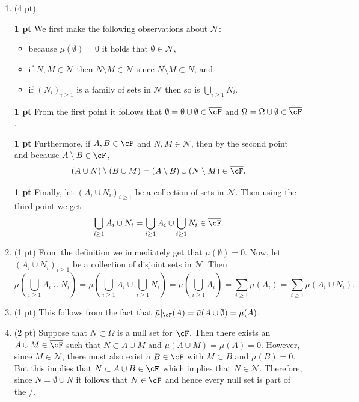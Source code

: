 \begin{enumerate}[label=(\alph*)]
\item (4 pt) 

\textbf{1 pt}
We first make the following observations about $\mathcal{N}$:
\begin{itemize}
\item because $\mu(\emptyset) = 0$ it holds that $\emptyset \in \mathcal{N}$,
\item if $N, M \in \mathcal{N}$ then $N \setminus M \in \mathcal{N}$ since $N \setminus M \subset N$, and
\item if $(N_i)_{i \ge 1}$ is a family of sets in $\mathcal{N}$ then so is $\bigcup_{i \ge 1} N_i$.
\end{itemize}

\textbf{1 pt}
From the first point it follows that $\emptyset = \emptyset \cup \emptyset \in \overline{\cF}$ and $\Omega = \Omega \cup \emptyset \in \overline{\cF}$.

\textbf{1 pt}
Furthermore, if $A, B \in \cF$ and $N, M \in \mathcal{N}$, then by the second point and because $A \setminus B \in \cF$,
\[
	(A \cup N) \setminus (B \cup M) = (A \setminus B) \cup (N \setminus M) \in \overline{\cF}.
\]

\textbf{1 pt}
Finally, let $(A_i \cup N_i)_{i \ge 1}$ be a collection of sets in $\mathcal{N}$. Then using the third point we get
\[
	\bigcup_{i \ge 1} A_i \cup N_i = \bigcup_{i \ge 1} A_i \cup \bigcup_{i \ge 1} N_i \in \overline{\cF}.
\]
\item (1 pt) From the definition we immediately get that $\mu(\emptyset) = 0$. Now, let $(A_i \cup N_i)_{i \ge 1}$ be a collection of disjoint sets in $\mathcal{N}$. Then
\[
	\bar{\mu}(\bigcup_{i \ge 1} A_i \cup N_i) = \bar{\mu}(\bigcup_{i \ge 1} A_i \cup \bigcup_{i \ge 1} N_i)
	= \mu(\bigcup_{i \ge 1} A_i) = \sum_{i \ge 1} \mu(A_i) = \sum_{i \ge 1} \bar{\mu}(A_i \cup N_i).
\]
\item (1 pt)
This follows from the fact that $\bar{\mu}|_\cF(A) = \bar{\mu}(A \cup \emptyset) = \mu(A)$.
\item (2 pt)
Suppose that $N \subset \Omega$ is a null set for $\overline{\cF}$. Then there exists an $A \cup M \in \overline{\cF}$ such that $N \subset A \cup M$ and $\bar{\mu}(A \cup M) = \mu(A) = 0$. However, since $M \in \mathcal{N}$, there must also exist a $B \in \cF$ with $M \subset B$ and $\mu(B) = 0$. But this implies that $N \subset A \cup B \in \cF$ which implies that $N \in \mathcal{N}$. Therefore, since $N = \emptyset \cup N$ it follows that $N \in \overline{\cF}$ and hence every null set is part of the \sigalg/.
\end{enumerate}